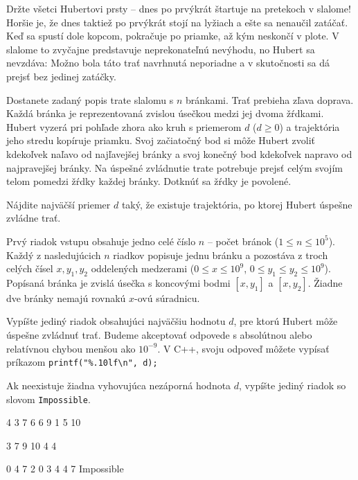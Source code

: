 





Držte všetci Hubertovi prsty -- dnes po prvýkrát štartuje na pretekoch v
slalome! Horšie je, že dnes taktiež po prvýkrát stojí na lyžiach a ešte sa
nenaučil zatáčať. Keď sa spustí dole kopcom, pokračuje po priamke, až kým
neskončí v plote. V slalome to zvyčajne predstavuje neprekonateľnú nevýhodu, no
Hubert sa nevzdáva: Možno bola táto trať navrhnutá neporiadne a v skutočnosti sa
dá prejsť bez jedinej zatáčky.



Dostanete zadaný popis trate slalomu s $n$ bránkami. Trať prebieha zľava
doprava. Každá bránka je reprezentovaná zvislou úsečkou medzi jej dvoma žŕdkami.
Hubert vyzerá pri pohľade zhora ako kruh s priemerom $d$ ($d \geq 0$) a
trajektória jeho stredu kopíruje priamku. Svoj začiatočný bod si môže Hubert
zvoliť kdekoľvek naľavo od najľavejšej bránky a svoj konečný bod kdekoľvek
napravo od najpravejšej bránky. Na úspešné zvládnutie trate potrebuje prejsť
celým svojím telom pomedzi žŕdky každej bránky. Dotknúť sa žŕdky je povolené.

Nájdite najväčší priemer $d$ taký, že existuje trajektória, po ktorej Hubert
úspešne zvládne trať.



Prvý riadok vstupu obsahuje jedno celé číslo $n$ -- počet bránok ($1 \leq n
\leq 10^5$). Každý z nasledujúcich $n$ riadkov popisuje jednu bránku a pozostáva
z troch celých čísel $x, y_1, y_2$ oddelených medzerami ($0 \leq x \leq 10^9$,
$0 \leq y_1 \leq y_2 \leq 10^9$). Popísaná bránka je zvislá úsečka s koncovými
bodmi $[x, y_1]$ a $[x, y_2]$. Žiadne dve bránky nemajú rovnakú $x$-ovú
súradnicu.



Vypíšte jediný riadok obsahujúci najväčšiu hodnotu $d$, pre ktorú Hubert môže
úspešne zvládnuť trať. Budeme akceptovať odpovede s absolútnou alebo relatívnou
chybou menšou ako $10^{-9}$. V C++, svoju odpoveď môžete vypísať príkazom
\verb!printf("%.10lf\n", d);!

Ak neexistuje žiadna vyhovujúca nezáporná hodnota $d$, vypíšte jediný riadok so
slovom \texttt{Impossible}.



4 3 7
6 6 9
1 5 10
\sampleEND

3 7 9
10 4 4
\sampleEND

0 4 7
2 0 3
4 4 7
\sampleOUT
Impossible
\sampleEND



